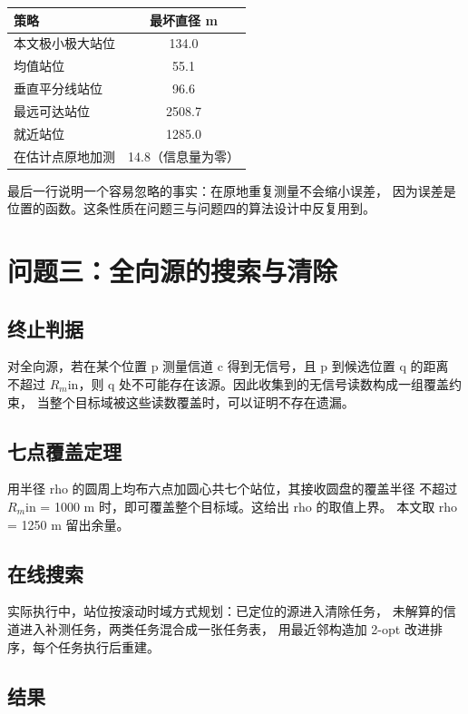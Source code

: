 \begin{center}
\begin{tabular}{lc}
\toprule
策略 & 最坏直径 m \\
\midrule
本文极小极大站位 & 134.0 \\
均值站位 & 55.1 \\
垂直平分线站位 & 96.6 \\
最远可达站位 & 2508.7 \\
就近站位 & 1285.0 \\
在估计点原地加测 & 14.8（信息量为零） \\
\bottomrule
\end{tabular}
\end{center}

最后一行说明一个容易忽略的事实：在原地重复测量不会缩小误差，
因为误差是位置的函数。这条性质在问题三与问题四的算法设计中反复用到。

\section{问题三：全向源的搜索与清除}

\subsection{终止判据}

对全向源，若在某个位置 p 测量信道 c 得到无信号，且 p 到候选位置 q 的距离
不超过 $R_m$in，则 q 处不可能存在该源。因此收集到的无信号读数构成一组覆盖约束，
当整个目标域被这些读数覆盖时，可以证明不存在遗漏。

\subsection{七点覆盖定理}

用半径 rho 的圆周上均布六点加圆心共七个站位，其接收圆盘的覆盖半径
不超过 $R_m$in = 1000 m 时，即可覆盖整个目标域。这给出 rho 的取值上界。
本文取 rho = 1250 m 留出余量。

\subsection{在线搜索}

实际执行中，站位按滚动时域方式规划：已定位的源进入清除任务，
未解算的信道进入补测任务，两类任务混合成一张任务表，
用最近邻构造加 2-opt 改进排序，每个任务执行后重建。

\subsection{结果}

